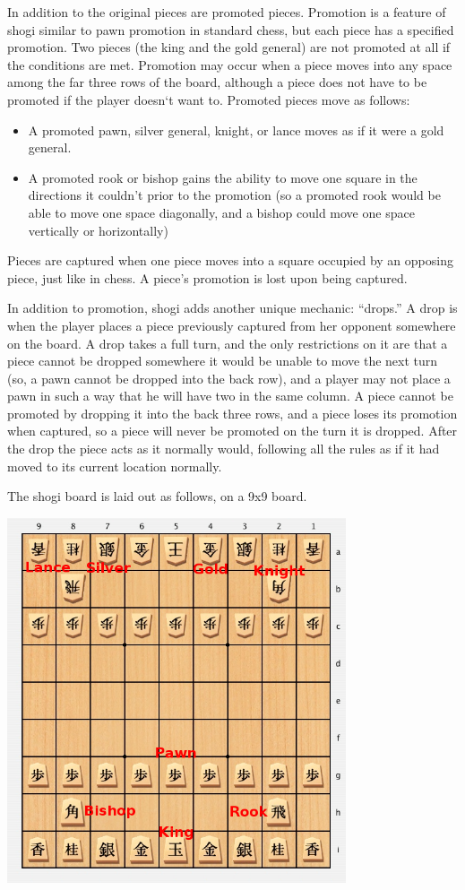 \documentclass[letterpaper,12pt]{article}
\begin{document}
 In addition to the original pieces are promoted pieces. Promotion is a feature of shogi similar to pawn promotion in standard chess, but each piece has a specified promotion. Two pieces (the king and the gold general) are not promoted at all if the conditions are met. Promotion may occur when a piece moves into any space among the far three rows of the board, although a piece does not have to be promoted if the player doesn`t want to. Promoted pieces move as follows:
  \begin{itemize}
  \item A promoted pawn, silver general, knight, or lance moves as if it were a gold general.
  \item A promoted rook or bishop gains the ability to move one square in the directions it couldn't prior to the promotion (so a promoted rook would be able to move one space diagonally, and a bishop could move one space vertically or horizontally)
  \end{itemize}

Pieces are captured when one piece moves into a square occupied by an opposing piece, just like in chess. A piece's promotion is lost upon being captured.

In addition to promotion, shogi adds another unique mechanic: ``drops.'' A drop is when the player places a piece previously captured from her opponent somewhere on the board. A drop takes a full turn, and the only restrictions on it are that a piece cannot be dropped somewhere it would be unable to move the next turn (so, a pawn cannot be dropped into the back row), and a player may not place a pawn in such a way that he will have two in the same column. A piece cannot be promoted by dropping it into the back three rows, and a piece loses its promotion when captured, so a piece will never be promoted on the turn it is dropped. After the drop the piece acts as it normally would, following all the rules as if it had moved to its current location normally.

The shogi board is laid out as follows, on a 9x9 board.

\begin{center}
 \includegraphics[width=10cm]{img/shogiBoard.png}
\end{center}
\end{document}
